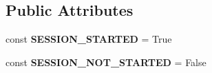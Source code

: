 \subsection*{Public Attributes}
\begin{DoxyCompactItemize}
\item 
\hypertarget{classSessionMgr_aa3b423ebb39b16714c0baec2d2a6df8d}{const {\bfseries S\-E\-S\-S\-I\-O\-N\-\_\-\-S\-T\-A\-R\-T\-E\-D} = True}\label{classSessionMgr_aa3b423ebb39b16714c0baec2d2a6df8d}

\item 
\hypertarget{classSessionMgr_acc8882dff09da4854e1b02245f25de95}{const {\bfseries S\-E\-S\-S\-I\-O\-N\-\_\-\-N\-O\-T\-\_\-\-S\-T\-A\-R\-T\-E\-D} = False}\label{classSessionMgr_acc8882dff09da4854e1b02245f25de95}

\end{DoxyCompactItemize}


